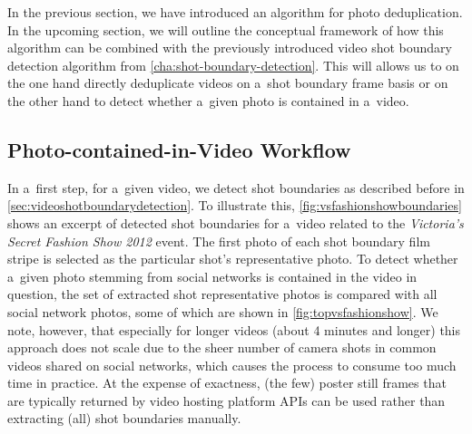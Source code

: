 In the previous section, we have introduced
an algorithm for photo deduplication.
In the upcoming section, we will outline the conceptual framework
of how this algorithm can be combined with the previously introduced
video shot boundary detection algorithm from \autoref{cha:shot-boundary-detection}.
This will allows us to on the one hand
directly deduplicate videos on a~shot boundary frame basis
or on the other hand to detect
whether a~given photo is contained in a~video.

\subsection{Photo-contained-in-Video Workflow}

In a~first step, for a~given video, we detect shot boundaries
as described before in \autoref{sec:videoshotboundarydetection}.
To illustrate this,
\autoref{fig:vsfashionshowboundaries} shows an excerpt
of detected shot boundaries for a~video related to
the \emph{Victoria's Secret Fashion Show 2012} event.
The first photo of each shot boundary film stripe
is selected as the particular shot's representative photo.
To detect whether a~given photo stemming from social networks
is contained in the video in question,
the set of extracted shot representative photos is compared
with all social network photos,
some of which are shown in \autoref{fig:topvsfashionshow}.
We note, however, that especially for longer videos
(about 4 minutes and longer)
this approach does not scale due to the sheer number of camera shots
in common videos shared on social networks,
which causes the process to consume too much time in practice.
At the expense of exactness, (the few) poster still frames
that are typically returned by video hosting platform APIs
can be used rather than extracting (all) shot boundaries manually.

